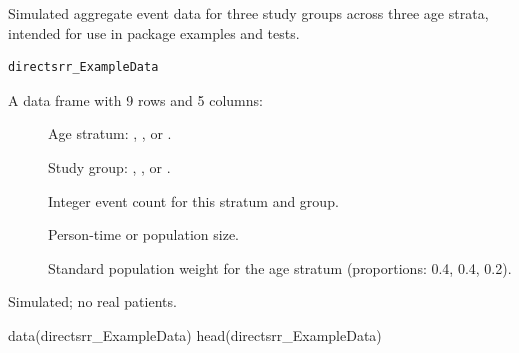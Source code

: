 \documentclass[a4paper]{book}
\begin{document}
%
\begin{Description}
Simulated aggregate event data for three study groups across three age
strata, intended for use in package examples and tests.
\end{Description}
%
\begin{Usage}
\begin{verbatim}
directsrr_ExampleData
\end{verbatim}
\end{Usage}
%
\begin{Format}
A data frame with 9 rows and 5 columns:
\begin{description}

\item[] Age stratum: , , or .
\item[] Study group: , , or .
\item[] Integer event count for this stratum and group.
\item[] Person-time or population size.
\item[] Standard population weight for the age stratum
(proportions: 0.4, 0.4, 0.2).

\end{description}

\end{Format}
%
\begin{Source}
Simulated; no real patients.
\end{Source}
%
\begin{Examples}
\begin{ExampleCode}
data(directsrr_ExampleData)
head(directsrr_ExampleData)
\end{ExampleCode}
\end{Examples}
\printindex{}
\end{document}
